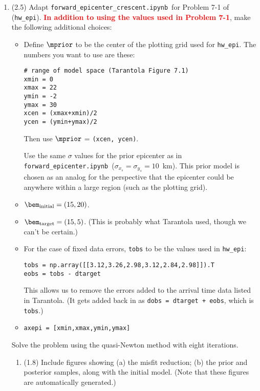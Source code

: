 \documentclass[11pt,titlepage,fleqn]{article}
\newcommand{\tfileFE}{{\tt forward\_epicenter.ipynb}}
\newcommand{\tfileFEC}{{\tt forward\_epicenter\_crescent.ipynb}}
\begin{document}
\begin{enumerate}

\item (2.5) Adapt \tfileFEC\ for Problem 7-1 of \citet{Tarantola2005} (\verb+hw_epi+). \textcolor{red}{\bf In addition to using the values used in Problem 7-1}, make the following additional choices:
%
\begin{itemize}
\item Define $\mprior$ to be the center of the plotting grid used for \verb+hw_epi+. The numbers you want to use are these:
%
\begin{verbatim}
# range of model space (Tarantola Figure 7.1)
xmin = 0
xmax = 22
ymin = -2
ymax = 30
xcen = (xmax+xmin)/2
ycen = (ymin+ymax)/2
\end{verbatim}
%
Then use $\mprior$ = \verb+(xcen, ycen)+.

Use the same $\sigma$ values for the prior epicenter as in \tfileFE\ ($\sigma_{x_s} = \sigma_{y_s} = 10$~km). This prior model is chosen as an analog for the perspective that the epicenter could be anywhere within a large region (such as the plotting grid).

\item $\bem_{\rm initial} = (15, 20)$.

\item $\bem_{\rm target} = (15, 5)$. (This is probably what Tarantola used, though we can't be certain.)

\item For the case of fixed data errors, \verb+tobs+ to be the values used in \verb+hw_epi+:
%
\begin{verbatim}
tobs = np.array([[3.12,3.26,2.98,3.12,2.84,2.98]]).T
eobs = tobs - dtarget
\end{verbatim}
%
This allows us to remove the errors added to the arrival time data listed in Tarantola. (It gets added back in as {\tt dobs = dtarget + eobs}, which is \verb+tobs+.)

\item \verb+axepi = [xmin,xmax,ymin,ymax]+

\end{itemize}

Solve the problem using the quasi-Newton method with eight iterations.
%
\begin{enumerate}
\item (1.8) Include figures showing (a) the misfit reduction; (b) the prior and posterior samples, along with the initial model. (Note that these figures are automatically generated.)


\end{enumerate}
\end{enumerate}
\end{document}

